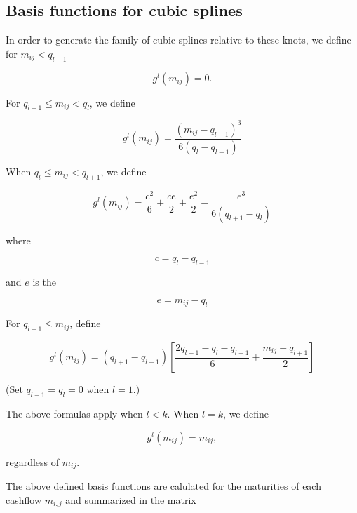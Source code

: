 \subsection{Basis functions for cubic splines}

In order to generate the family of cubic splines relative to these knots, we define for $m_{ij}<q_{l-1}$

\begin{equation*}
  \label{eq:A.2}
  g^l(m_{ij})=0.
\end{equation*}


For $q_{l-1}\leq m_{ij} <q_l$, we define

\begin{equation*}
  \label{eq:A.3}
  g^l(m_{ij})=\frac{(m_{ij}-q_{l-1})^3}{6(q_l-q_{l-1})}
\end{equation*}

When $q_l\leq m_{ij}< q_{l+1}$, we define

\begin{equation*}
  \label{eq:A.4a}
  g^l(m_{ij}) = \frac{c^2}{6}+\frac{ce}{2}+\frac{e^2}{2}-\frac{e^3}{6(q_{l+1}-q_l)}
\end{equation*}

where

\begin{equation*}
  \label{eq:A.4b}
  c = q_l-q_{l-1}
\end{equation*}

and $e$ is the 

\begin{equation*}
  \label{eq:A.4c}
  e = m_{ij}-q_l
\end{equation*}

For $q_{l+1}\leq m_{ij}$, define

\begin{equation*}
  \label{eq:A.5}
  g^l(m_{ij}) = (q_{l+1}-q_{l-1})\left[\frac{2q_{l+1}-q_l-q_{l-1}}{6}+\frac{m_{ij}-q_{l+1}}{2}\right]
\end{equation*}

(Set $q_{l-1}=q_l=0$ when $l=1$.)

The above formulas apply when $l<k$. When $l=k$, we define

\begin{equation*}
  \label{eq:A.6}
 g^l(m_{ij})= m_{ij},
\end{equation*}

regardless of $m_{ij}$.

The above defined basis functions are calulated for the maturities of each cashflow $m_{i,j}$ and summarized in the matrix

